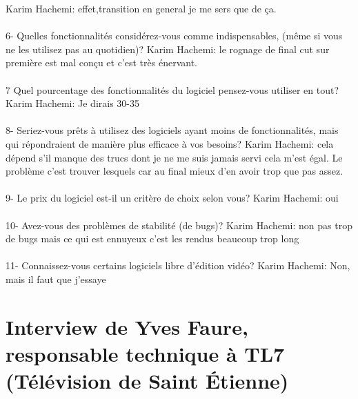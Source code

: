 Karim Hachemi: effet,transition en general je me sers que de ça.

\paragraph{}
6-  Quelles fonctionnalités considérez-vous comme indispensables, (même si vous
ne les utilisez pas au quotidien)?
Karim Hachemi: le rognage de final cut sur première est mal conçu et c'est très
énervant.

\paragraph{}
7 Quel pourcentage des fonctionnalités du logiciel pensez-vous utiliser
en tout?
Karim Hachemi: Je dirais 30-35%

\paragraph{}
8- Seriez-vous prêts à utilisez des logiciels ayant moins de fonctionnalités,
mais qui répondraient de manière plus efficace à vos besoins?
Karim Hachemi: cela dépend s'il manque des trucs dont je ne me
suis jamais servi cela m'est égal. Le problème c'est
trouver lesquels car au final mieux d'en avoir trop que pas assez.

\paragraph{}
9-  Le prix du logiciel est-il un critère de choix selon vous?
Karim Hachemi: oui

\paragraph{}
10- Avez-vous des problèmes de stabilité (de bugs)?
Karim Hachemi: non pas trop de bugs mais ce qui est ennuyeux c'est les
rendus beaucoup trop long

\paragraph{}
11- Connaissez-vous certains logiciels libre d'édition vidéo?
Karim Hachemi: Non, mais il faut que j'essaye

\section*{Interview de Yves Faure,  responsable technique à TL7
(Télévision de Saint Étienne)}

